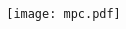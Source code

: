 \begin{frame}
\begin{columns}[T]
\begin{column}{0.48\textwidth}
		\end{column}

		\begin{column}{0.48\textwidth}
			\begin{center}
				\texttt{[image: mpc.pdf]}
			\end{center}

		\end{column}
	\end{columns}
\end{frame}




